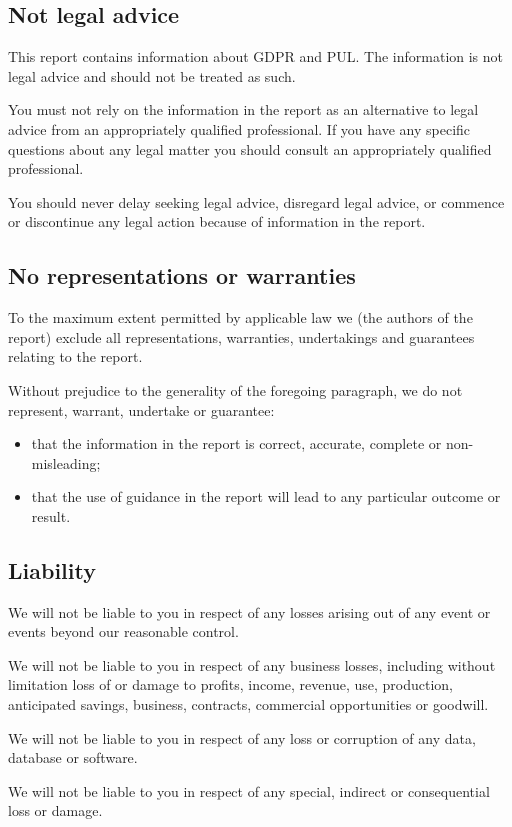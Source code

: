 \subsection{Not legal advice}
This report contains information about GDPR and PUL. The information is not legal advice and should not be treated as such.

You must not rely on the information in the report as an alternative to legal advice from an appropriately qualified professional. If you have any specific questions about any legal matter you should consult an appropriately qualified professional.

You should never delay seeking legal advice, disregard legal advice, or commence or discontinue any legal action because of information in the report.

\subsection{No representations or warranties}
To the maximum extent permitted by applicable law we (the authors of the report) exclude all representations, warranties, undertakings and guarantees relating to the report.

Without prejudice to the generality of the foregoing paragraph, we do not represent, warrant, undertake or guarantee:
\begin{itemize}
\item that the information in the report is correct, accurate, complete or non-misleading;
\item that the use of guidance in the report will lead to any particular outcome or result.
\end{itemize}

\subsection{Liability}
We will not be liable to you in respect of any losses arising out of any event or events beyond our reasonable control.

We will not be liable to you in respect of any business losses, including without limitation loss of or damage to profits, income, revenue, use, production, anticipated savings, business, contracts, commercial opportunities or goodwill.

We will not be liable to you in respect of any loss or corruption of any data, database or software.

We will not be liable to you in respect of any special, indirect or consequential loss or damage.

